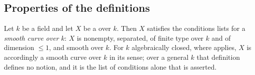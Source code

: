 \subsection{Properties of the definitions}

\begin{lemma}\label{lem:pc-curves-are-sc}
Let $k$ be a field and let $X$ be a
 over
$k$.  Then $X$ satisfies the conditions  lists for
a \emph{smooth curve over $k$}: $X$ is nonempty, separated, of finite
type over $k$ and of dimension $\le1$, and smooth over $k$.  For $k$
algebraically closed, where  applies, $X$ is
accordingly a smooth curve over $k$ in its sense; over a general $k$
that definition defines no notion, and it is the list of conditions
alone that is asserted.
\end{lemma}
%
